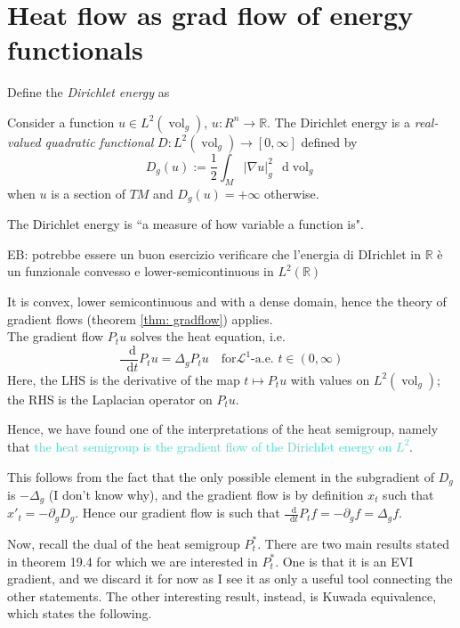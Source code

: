 \documentclass[a4paper,12pt,reqno]{amsbook}
\theoremstyle{definition} %
\newcommand*\de{\mathop{}\!\mathrm{d}}
\newcommand{\1}{\mathbbm{1}}
\newcommand{\mL}{\mathscr{L}}
\newcommand{\R}{\ensuremath{\mathbb{R}}}
\DeclareMathOperator{\vol}{vol}
\def\vol{\mathop{\mathrm{vol}}\nolimits}
\theoremstyle{plain}
\theoremstyle{remark}
\begin{document}
{\section{Heat flow as grad flow of energy functionals}\label{sec: heat flow antropy}
Define the \emph{Dirichlet energy} as

\begin{definition}
Consider a function $ u \in L^2(\vol_g) $, $u: R^n \to \R$. The Dirichlet energy is a \emph{real-valued quadratic functional} $D:L^2(\vol_g)\to[0,\infty]$ defined by
\[
D_g(u):= \frac{1}{2}\int_M |\nabla u|_g^2 \, \de{\vol_g}
\]
when $u$ is a section of $TM$ and $D_g(u)=+\infty$ otherwise. 
\end{definition}    

The Dirichlet energy is ``a measure of how variable a function is". 

{\color{blue}EB: potrebbe essere un buon esercizio verificare che l'energia di DIrichlet in $\mathbb R$ è un funzionale convesso e lower-semicontinuous in $L^2(\mathbb{R})$}


It is convex, lower semicontinuous and with a dense domain, hence the theory of gradient flows (theorem \ref{thm: gradflow}) applies.
\\

The gradient flow $P_t u$ solves the heat equation, i.e. 
\[
\frac{\de{}}{\de{t}}P_t u = \Delta_g P_t u \quad \text{for} \mL^1\text{-a.e. } t\in (0,\infty)
\]
Here, the LHS is the derivative of the map $t\mapsto P_t u$ with values on $L^2(\vol_g)$; the RHS is the Laplacian operator on $P_tu$. 

Hence, we have found one of the interpretations of the heat semigroup, namely that \textcolor{Turquoise}{the heat semigroup is the gradient flow of the Dirichlet energy on $L^2$}. 

This follows from the fact that the only possible element in the subgradient of $D_g$ is $-\Delta_g$ (I don't know why), and the gradient flow is by definition $x_t$ such that $x'_t = -\partial_g D_g$. Hence our gradient flow is such that $\frac{\de{}}{\de{t}}P_tf = -\partial_g f = \Delta_g f$. 

Now, recall the dual of the heat semigroup $P_t^*$. There are two main results stated in theorem 19.4 for which we are interested in $P_t^*$. One is that it is an EVI gradient, and we discard it for now as I see it as only a useful tool connecting the other statements. The other interesting result, instead, is \textcolor{WildStrawberry}{Kuwada equivalence}, which states the following. 

}
\end{document}
